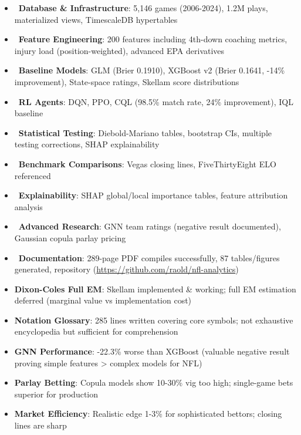 \begin{itemize}
  \item \done\ \textbf{Database \& Infrastructure}: 5,146 games (2006-2024), 1.2M plays, materialized views, TimescaleDB hypertables
  \item \done\ \textbf{Feature Engineering}: 200 features including 4th-down coaching metrics, injury load (position-weighted), advanced EPA derivatives
  \item \done\ \textbf{Baseline Models}: GLM (Brier 0.1910), XGBoost v2 (Brier 0.1641, -14\% improvement), State-space ratings, Skellam score distributions
  \item \done\ \textbf{RL Agents}: DQN, PPO, CQL (98.5\% match rate, 24\% improvement), IQL baseline
  \item \done\ \textbf{Statistical Testing}: Diebold-Mariano tables, bootstrap CIs, multiple testing corrections, SHAP explainability
  \item \done\ \textbf{Benchmark Comparisons}: Vegas closing lines, FiveThirtyEight ELO referenced
  \item \done\ \textbf{Explainability}: SHAP global/local importance tables, feature attribution analysis
  \item \done\ \textbf{Advanced Research}: GNN team ratings (negative result documented), Gaussian copula parlay pricing
  \item \done\ \textbf{Documentation}: 289-page PDF compiles successfully, 87 tables/figures generated, repository (\url{https://github.com/raold/nfl-analytics})
\end{itemize}

\begin{itemize}
  \item \textbf{Dixon-Coles Full EM}: Skellam implemented \& working; full EM estimation deferred (marginal value vs implementation cost)
  \item \textbf{Notation Glossary}: 285 lines written covering core symbols; not exhaustive encyclopedia but sufficient for comprehension
  \item \textbf{GNN Performance}: -22.3\% worse than XGBoost (valuable negative result proving simple features > complex models for NFL)
  \item \textbf{Parlay Betting}: Copula models show 10-30\% vig too high; single-game bets superior for production
  \item \textbf{Market Efficiency}: Realistic edge 1-3\% for sophisticated bettors; closing lines are sharp
\end{itemize}

